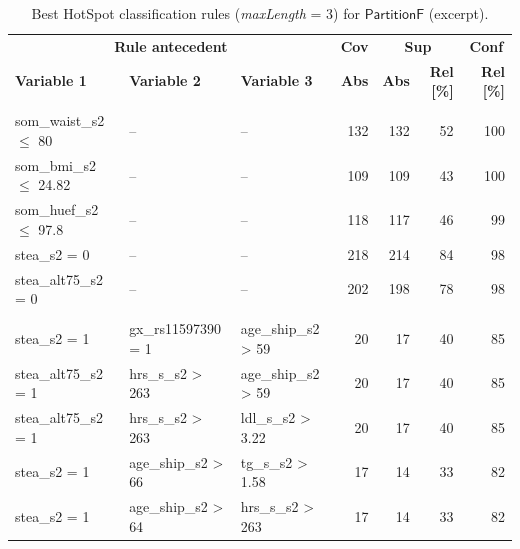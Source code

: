 \documentclass[
  oneside]{book}
\begin{document}
\begin{table}

\caption{\label{tab:03-rule-list-women}Best HotSpot classification rules (\emph{maxLength} = 3) for \(\mathsf{PartitionF}\) (excerpt).}
\centering
\begin{tabular}[t]{lllrrrr}
\toprule
\multicolumn{3}{c}{\textbf{Rule antecedent}} & \multicolumn{1}{c}{\textbf{Cov}} & \multicolumn{2}{c}{\textbf{Sup}} & \multicolumn{1}{c}{\textbf{Conf}} \\
\cmidrule(l{3pt}r{3pt}){1-3} \cmidrule(l{3pt}r{3pt}){4-4} \cmidrule(l{3pt}r{3pt}){5-6} \cmidrule(l{3pt}r{3pt}){7-7}
\textbf{Variable 1} & \textbf{Variable 2} & \textbf{Variable 3} & \textbf{Abs} & \textbf{Abs} & \textbf{Rel [\%]} & \textbf{Rel [\%]}\\
\midrule
\addlinespace[0.3em]
\multicolumn{7}{l}{\textbf{Target class: A}}\\
\hspace{1em}som\_waist\_s2 $\leq$ 80 & -- & -- & 132 & 132 & 52 & 100\\
\hspace{1em}som\_bmi\_s2 $\leq$ 24.82 & -- & -- & 109 & 109 & 43 & 100\\
\hspace{1em}som\_huef\_s2 $\leq$ 97.8 & -- & -- & 118 & 117 & 46 & 99\\
\hspace{1em}stea\_s2 = 0 & -- & -- & 218 & 214 & 84 & 98\\
\hspace{1em}stea\_alt75\_s2 = 0 & -- & -- & 202 & 198 & 78 & 98\\
\addlinespace[0.3em]
\multicolumn{7}{l}{\textbf{Target class: B}}\\
\hspace{1em}stea\_s2 = 1 & gx\_rs11597390 = 1 & age\_ship\_s2 > 59 & 20 & 17 & 40 & 85\\
\hspace{1em}stea\_alt75\_s2 = 1 & hrs\_s\_s2 > 263 & age\_ship\_s2 > 59 & 20 & 17 & 40 & 85\\
\hspace{1em}stea\_alt75\_s2 = 1 & hrs\_s\_s2 > 263 & ldl\_s\_s2 > 3.22 & 20 & 17 & 40 & 85\\
\hspace{1em}stea\_s2 = 1 & age\_ship\_s2 > 66 & tg\_s\_s2 > 1.58 & 17 & 14 & 33 & 82\\
\hspace{1em}stea\_s2 = 1 & age\_ship\_s2 > 64 & hrs\_s\_s2 > 263 & 17 & 14 & 33 & 82\\

\end{tabular}
\end{table}
\end{document}
